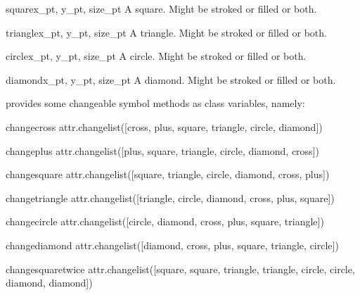 \begin{methoddesc}{square}{x_pt, y_pt, size_pt}
  A square. Might be stroked or filled or both.
\end{methoddesc}

\begin{methoddesc}{triangle}{x_pt, y_pt, size_pt}
  A triangle. Might be stroked or filled or both.
\end{methoddesc}

\begin{methoddesc}{circle}{x_pt, y_pt, size_pt}
  A circle. Might be stroked or filled or both.
\end{methoddesc}

\begin{methoddesc}{diamond}{x_pt, y_pt, size_pt}
  A diamond. Might be stroked or filled or both.
\end{methoddesc}

 provides some changeable symbol methods as class
variables, namely:

\begin{memberdesc}{changecross}
  attr.changelist([cross, plus, square, triangle, circle, diamond])
\end{memberdesc}

\begin{memberdesc}{changeplus}
  attr.changelist([plus, square, triangle, circle, diamond, cross])
\end{memberdesc}

\begin{memberdesc}{changesquare}
  attr.changelist([square, triangle, circle, diamond, cross, plus])
\end{memberdesc}

\begin{memberdesc}{changetriangle}
  attr.changelist([triangle, circle, diamond, cross, plus, square])
\end{memberdesc}

\begin{memberdesc}{changecircle}
  attr.changelist([circle, diamond, cross, plus, square, triangle])
\end{memberdesc}

\begin{memberdesc}{changediamond}
  attr.changelist([diamond, cross, plus, square, triangle, circle])
\end{memberdesc}

\begin{memberdesc}{changesquaretwice}
  attr.changelist([square, square, triangle, triangle, circle, circle, diamond, diamond])
\end{memberdesc}

